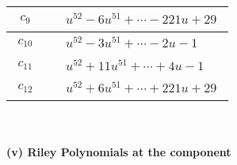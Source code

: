 \documentclass[1p]{elsarticle_modified}
\theoremstyle{definition}
\begin{document}
\begin{tabular}{m{50pt}|m{274pt}}
\hline $$\begin{aligned}c_{9}\end{aligned}$$&$\begin{aligned}
&u^{52}-6 u^{51}+\cdots-221 u+29
\end{aligned}$\\
\hline $$\begin{aligned}c_{10}\end{aligned}$$&$\begin{aligned}
&u^{52}-3 u^{51}+\cdots-2 u-1
\end{aligned}$\\
\hline $$\begin{aligned}c_{11}\end{aligned}$$&$\begin{aligned}
&u^{52}+11 u^{51}+\cdots+4 u-1
\end{aligned}$\\
\hline $$\begin{aligned}c_{12}\end{aligned}$$&$\begin{aligned}
&u^{52}+6 u^{51}+\cdots+221 u+29
\end{aligned}$\\
\hline
\end{tabular}\\~\\
\newpage\renewcommand{\arraystretch}{1}
\flushleft \textbf{(v) Riley Polynomials at the component}\newline \\
\end{document}
